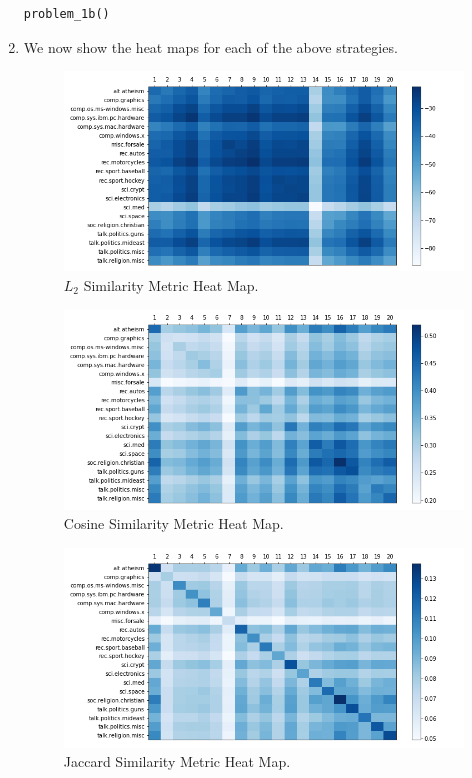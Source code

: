 \documentclass[12pt]{article}
\begin{document}
\begin{enumerate}[label=(\alph*)]
\begin{verbatim}
problem_1b()
    \end{verbatim}
  \item
    We now show the heat maps for each of the above strategies.

    \begin{figure}[!ht]
      \centering
      \includegraphics[scale=0.5]{figures/L2.png}
      \caption{$L_2$ Similarity Metric Heat Map.}
      \label{fig:l2}
    \end{figure}
    \begin{figure}[!ht]
      \centering
      \includegraphics[scale=0.5]{figures/Cosine.png}
      \caption{Cosine Similarity Metric Heat Map.}
      \label{fig:cosine}
    \end{figure}
    \begin{figure}[!ht]
      \centering
      \includegraphics[scale=0.5]{figures/Jaccard.png}
      \caption{Jaccard Similarity Metric Heat Map.}
      \label{fig:jaccard}
    \end{figure}


\end{enumerate}
\end{document}
